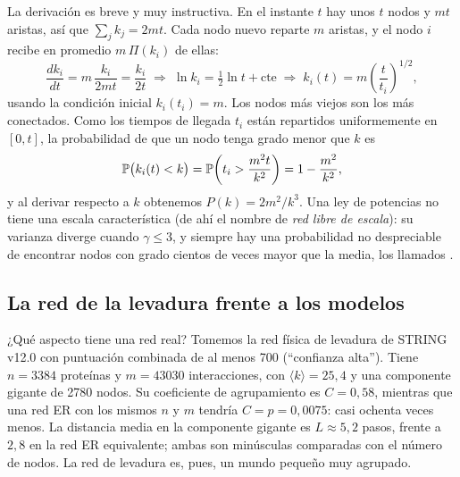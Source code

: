 La derivación es breve y muy instructiva. En el instante $t$ hay unos $t$ nodos y $mt$ aristas, así que $\sum_j k_j=2mt$. Cada nodo nuevo reparte $m$ aristas, y el nodo $i$ recibe en promedio $m\,\Pi(k_i)$ de ellas:
\[
\frac{dk_i}{dt}=m\,\frac{k_i}{2mt}=\frac{k_i}{2t}
\;\Longrightarrow\; \ln k_i = \tfrac12\ln t + \text{cte}
\;\Longrightarrow\; k_i(t)=m\left(\frac{t}{t_i}\right)^{1/2},
\]
usando la condición inicial $k_i(t_i)=m$. Los nodos más viejos son los más conectados. Como los tiempos de llegada $t_i$ están repartidos uniformemente en $[0,t]$, la probabilidad de que un nodo tenga grado menor que $k$ es
\[
\mathbb{P}\big(k_i(t)<k\big)=\mathbb{P}\!\left(t_i>\frac{m^2t}{k^2}\right)=1-\frac{m^2}{k^2},
\]
y al derivar respecto a $k$ obtenemos $P(k)=2m^2/k^3$. Una ley de potencias no tiene una escala característica (de ahí el nombre de \emph{red libre de escala}): su varianza diverge cuando $\gamma\le3$, y siempre hay una probabilidad no despreciable de encontrar nodos con grado cientos de veces mayor que la media, los llamados .

\subsection{La red de la levadura frente a los modelos}

¿Qué aspecto tiene una red real? Tomemos la red física de levadura de STRING v12.0 con puntuación combinada de al menos 700 (``confianza alta''). Tiene $n=\num{3384}$ proteínas y $m=\num{43030}$ interacciones, con $\langle k\rangle=25{,}4$ y una componente gigante de \num{2780} nodos. Su coeficiente de agrupamiento es $C=0{,}58$, mientras que una red ER con los mismos $n$ y $m$ tendría $C=p=0{,}0075$: casi ochenta veces menos. La distancia media en la componente gigante es $L\approx5{,}2$ pasos, frente a $2{,}8$ en la red ER equivalente; ambas son minúsculas comparadas con el número de nodos. La red de levadura es, pues, un mundo pequeño muy agrupado.

